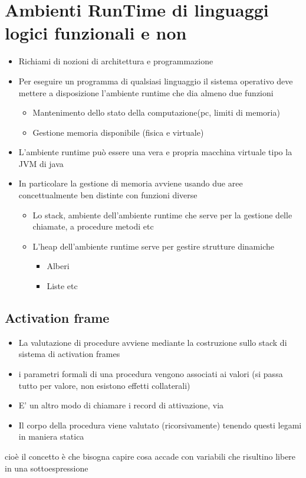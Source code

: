 \documentclass[12pt, a4paper, openany, oneside]{book}
\begin{document}
\section{Ambienti RunTime di linguaggi logici funzionali e non}
\begin{itemize}
	\item Richiami di nozioni di architettura e programmazione
	\item Per eseguire un programma di qualsiasi linguaggio il sistema operativo
	deve mettere a disposizione l'ambiente runtime che dia almeno due funzioni
	\begin{itemize}
		\item Mantenimento dello stato della computazione(pc, limiti di memoria)
		\item Gestione memoria disponibile (fisica e virtuale)
	\end{itemize}
	\item L'ambiente runtime può essere una vera e propria macchina virtuale tipo la JVM di java
	\item In particolare la gestione di memoria avviene usando due aree 
	concettualmente ben distinte con funzioni diverse
	\begin{itemize}
		\item Lo stack, ambiente dell'ambiente runtime che serve per la gestione 
		delle chiamate, a procedure metodi etc
		\item L'heap dell'ambiente runtime serve per gestire strutture dinamiche
		\begin{itemize}
			\item Alberi
			\item Liste etc
		\end{itemize}
	\end{itemize}
\end{itemize}
\subsection{Activation frame}
\begin{itemize}
	\item La valutazione di procedure avviene mediante la costruzione sullo
	stack di sistema di activation frames
	\item i parametri formali di una procedura vengono associati ai valori
	(si passa tutto per valore, non esistono effetti collaterali)
	\item E' un altro modo di chiamare i record di attivazione, via
	\item Il corpo della procedura viene valutato (ricorsivamente) tenendo 
	questi legami in maniera statica
\end{itemize}
cioè il concetto è che bisogna capire cosa accade con variabili che risultino 
libere in una sottoespressione
\end{document}
